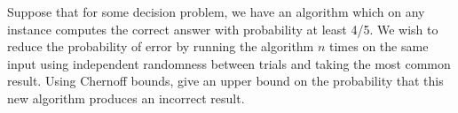 \problem{}
Suppose that for some decision problem, we have an algorithm which on any instance computes the correct answer with probability at least 4/5. We wish to reduce the probability of error by running the algorithm $n$ times on the same input using independent randomness between trials and taking the most common result. Using Chernoff bounds, give an upper bound on the probability that this new algorithm produces an incorrect result.

\solution{}
\newpage